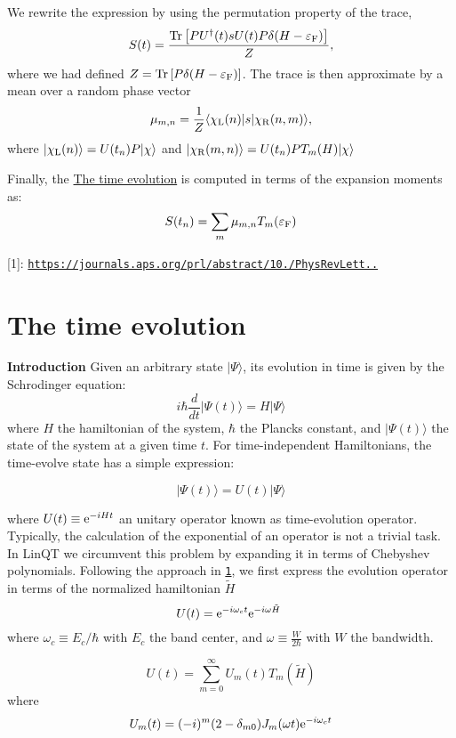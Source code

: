 We rewrite the expression by using the permutation property of the trace, \[ S( t) = \frac{ {\rm Tr}\left[ PU^\dagger(t) sU(t) P\delta(H-\varepsilon_{\rm F})\right]}{Z}, \] where we had defined $Z={\rm Tr}\left[ P\delta(H-\varepsilon_{\rm F})\right]$. The trace is then approximate by a mean over a random phase vector \[ \mu_{m,n} = \frac{1}{Z}\langle \chi_{\rm L}(n)| s|\chi_{\rm R}(n,m)\rangle, \] where $ |\chi_{\rm L}(n) \rangle = U(t_n)P|\chi\rangle $ and $ |\chi_{\rm R}(m,n) \rangle = U(t_n)PT_m(H)|\chi\rangle $

Finally, the \hyperlink{time_evolution}{The time evolution} is computed in terms of the expansion moments as\+: \[ S(t_n)= \sum_{m}\mu_{m,n} T_m(\varepsilon_{\rm F}) \]

\mbox{[}1\mbox{]}\+: \href{https://journals.aps.org/prl/abstract/10.1103/PhysRevLett.119.206601}{\tt https\+://journals.\+aps.\+org/prl/abstract/10./\+Phys\+Rev\+Lett..} \hypertarget{time_evolution}{}\section{The time evolution}\label{time_evolution}
{\bfseries Introduction} Given an arbitrary state $|\Psi\rangle$, its evolution in time is given by the Schrodinger equation\+: \[ i\hbar \frac{d}{dt}|\Psi(t)\rangle = H |\Psi\rangle \] where $H$ the hamiltonian of the system, $\hbar$ the Planck\textquotesingle{}s constant, and $|\Psi(t)\rangle$ the state of the system at a given time $t$. For time-\/independent Hamiltonians, the time-\/evolve state has a simple expression\+:

\[ |\Psi(t)\rangle = U(t)|\Psi\rangle \]

where $U(t)\equiv{\rm e}^{-i H t}$ an unitary operator known as time-\/evolution operator. Typically, the calculation of the exponential of an operator is not a trivial task. In Lin\+QT we circumvent this problem by expanding it in terms of Chebyshev polynomials. Following the approach in \href{https://journals.aps.org/rmp/abstract/10.1103/RevModPhys.78.275}{\tt 1}, we first express the evolution operator in terms of the normalized hamiltonian $\tilde{H}$ \[ U(t)={\rm e}^{-i \omega_c t} {\rm e}^{-i \omega \tilde{H}}\ \] where $\omega_c\equiv E_c/\hbar$ with $E_c$ the band center, and $\omega\equiv\frac{W}{2\hbar}$ with $W$ the bandwidth.

\[ U(t) = \sum_{m=0}^{\infty} U_m(t) T_m(\tilde{H}) \] where \[ U_m(t) = (-i)^m(2-\delta_{m0})J_m(\omega t){\rm e}^{-i \omega_c t} \] 